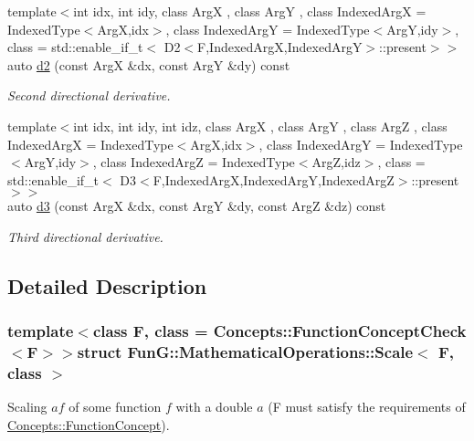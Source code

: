 \begin{DoxyCompactItemize}
{\footnotesize template$<$int idx, int idy, class Arg\-X , class Arg\-Y , class Indexed\-Arg\-X  = \-Indexed\-Type$<$\-Arg\-X,idx$>$, class Indexed\-Arg\-Y  = \-Indexed\-Type$<$\-Arg\-Y,idy$>$, class  = std\-::enable\-\_\-if\-\_\-t$<$ D2$<$\-F,\-Indexed\-Arg\-X,\-Indexed\-Arg\-Y$>$\-::present$>$$>$ }\\auto \hyperlink{structFunG_1_1MathematicalOperations_1_1Scale_a8be2b6ba1a541617acd73136467c938d}{d2} (const \-Arg\-X \&dx, const \-Arg\-Y \&dy) const 
\begin{DoxyCompactList}\small\item\em \-Second directional derivative. \end{DoxyCompactList}\item 
{\footnotesize template$<$int idx, int idy, int idz, class Arg\-X , class Arg\-Y , class Arg\-Z , class Indexed\-Arg\-X  = \-Indexed\-Type$<$\-Arg\-X,idx$>$, class Indexed\-Arg\-Y  = \-Indexed\-Type$<$\-Arg\-Y,idy$>$, class Indexed\-Arg\-Z  = \-Indexed\-Type$<$\-Arg\-Z,idz$>$, class  = std\-::enable\-\_\-if\-\_\-t$<$ D3$<$\-F,\-Indexed\-Arg\-X,\-Indexed\-Arg\-Y,\-Indexed\-Arg\-Z$>$\-::present $>$$>$ }\\auto \hyperlink{structFunG_1_1MathematicalOperations_1_1Scale_a070452119b00f2983a6e7ff7fdf890ed}{d3} (const \-Arg\-X \&dx, const \-Arg\-Y \&dy, const \-Arg\-Z \&dz) const 
\begin{DoxyCompactList}\small\item\em \-Third directional derivative. \end{DoxyCompactList}\end{DoxyCompactItemize}


\subsection{\-Detailed \-Description}
\subsubsection*{template$<$class F, class = \-Concepts\-::\-Function\-Concept\-Check$<$\-F$>$$>$struct Fun\-G\-::\-Mathematical\-Operations\-::\-Scale$<$ F, class $>$}

\-Scaling $ af $ of some function $ f $ with a double $ a $ (\-F must satisfy the requirements of \hyperlink{structFunG_1_1Concepts_1_1FunctionConcept}{\-Concepts\-::\-Function\-Concept}). 

